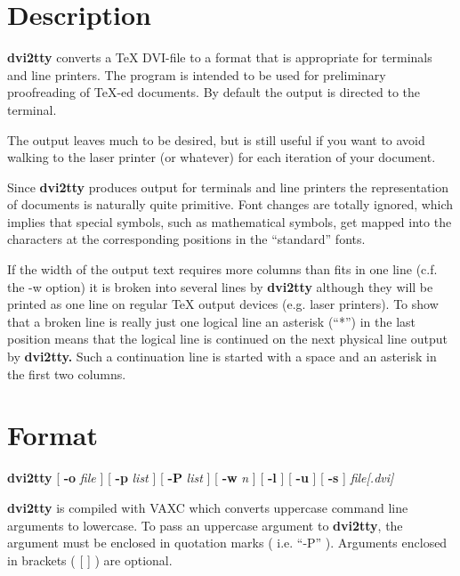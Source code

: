 \section*{Description}
{\bf dvi2tty}
converts a \TeX\/ DVI-file to a format that is appropriate for terminals
and line printers. The program is intended to be used for
preliminary proofreading of \TeX-ed documents.
By default the output is directed to the terminal.
%
%
\par\vspace{1.0\baselineskip}
The output leaves much to be desired, but is still
useful if you want to avoid walking to the
laser printer (or whatever) for each iteration of your
document.
\par\vspace{1.0\baselineskip}
Since {\bf dvi2tty}\/ produces output for terminals and line printers the
representation of documents is naturally quite primitive.
Font changes are totally ignored, which implies that
special symbols, such as mathematical symbols, get mapped into the 
characters at the corresponding positions in the ``standard'' fonts.
\par\vspace{1.0\baselineskip}
If the width of the output text requires more columns than fits
in one line (c.f. the -w option) it is broken into several lines by
{\bf dvi2tty} although they will be printed as one line on regular \TeX\/ output
devices (e.g. laser printers). To show that a broken line is really
just one logical line an asterisk (``*'') in the last position
means that the logical line is continued on the next physical
line output by {\bf dvi2tty.}
Such a continuation line is started with a space and an asterisk
in the first two columns.
\section*{Format}
{\bf dvi2tty}
[
{\bf -o}
{\it file}
]
[
{\bf -p}
{\it list}
]
[
{\bf -P}
{\it list}
]
[
{\bf -w}
{\it n}
]
[
{\bf -l}
]
[
{\bf -u}
]
[
{\bf -s}
]
{\it file\rm[\it.dvi\rm]}
\par\vspace{1.0\baselineskip}
{\bf dvi2tty}\/ is compiled with VAXC which converts uppercase command line
arguments to lowercase.  To pass an uppercase argument to {\bf dvi2tty},
the argument must be enclosed in quotation marks ( i.e. ``-P'' ).  Arguments
enclosed in brackets ( [ ] ) are optional.
